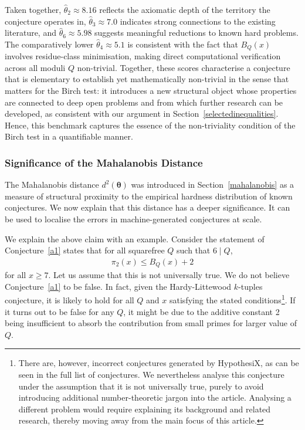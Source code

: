 \documentclass[11pt,reqno]{amsart}
\theoremstyle{plain}\newtheorem{theorem}{Theorem}[section]
\numberwithin{equation}{section}
\begin{document}
\medskip
\noindent
Taken together, $\hat{\theta}_2 \approx 8.16$ reflects the axiomatic depth of the territory the conjecture operates in, $\hat{\theta}_3 \approx 7.0$ indicates strong connections to the existing literature, and $\hat{\theta}_6 \approx 5.98$ suggests meaningful reductions to known hard problems. The comparatively lower $\hat{\theta}_4 \approx 5.1$ is consistent with the fact that $B_Q(x)$ involves residue-class minimisation, making direct computational verification across all moduli $Q$ non-trivial. Together, these scores characterise a conjecture that is elementary to establish yet mathematically non-trivial in the sense that matters for the Birch test: it introduces a new structural object whose properties are connected to deep open problems and from which further research can be developed, as consistent with our argument in Section~\ref{selectedinequalities}. Hence, this benchmark captures the essence of the non-triviality condition of the Birch test in a quantifiable manner.

\subsubsection{Significance of the Mahalanobis Distance}\label{d2importance}
The Mahalanobis distance $d^2(\bm{{\theta}})$ was introduced in Section~\ref{mahalanobis} as a measure of structural proximity to the empirical hardness distribution of known conjectures.  We now explain that this distance has a deeper significance. It can be used to localise the errors in machine-generated conjectures at scale. 

\medskip
We explain the above claim with an example. Consider the statement of Conjecture~\ref{a1} states that for all squarefree $Q$ such that $6 \mid Q$,
\begin{align}\label{incorrectrelation}
\pi_2(x)\leq B_Q(x)+2
\end{align}
for all $x\geq 7$. Let us assume that this is not universally true. We do not believe Conjecture~\ref{a1} to be false. In fact, given the Hardy-Littewood $k$-tuples conjecture, it is likely to hold for all $Q$ and $x$ satisfying the stated conditions\footnote{There are, however, incorrect conjectures generated by HypothesiX, as can be seen in the full list of conjectures. We nevertheless analyse this conjecture under the assumption that it is not universally true, purely to avoid introducing additional number-theoretic jargon into the article. Analysing a different problem would require explaining its background and related research, thereby moving away from the main focus of this article.}. If it turns out to be false for any $Q$, it might be due to the additive constant 2 being insufficient to absorb the contribution from small primes for larger value of $Q$.
\end{document}
